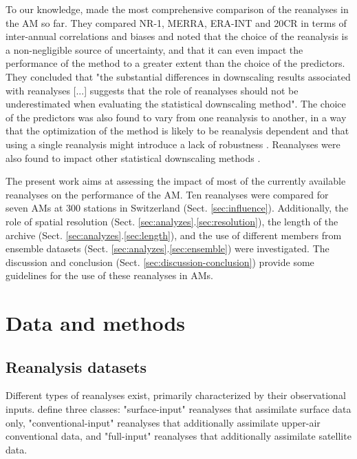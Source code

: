 \documentclass{ametsoc}
\begin{document}
	To our knowledge, \citet{Dayon2015} made the most comprehensive comparison of the reanalyses in the AM so far. They compared NR-1, MERRA, ERA-INT and 20CR in terms of inter-annual correlations and biases and noted that the choice of the reanalysis is a non-negligible source of uncertainty, and that it can even impact the performance of the method to a greater extent than the choice of the predictors. They concluded that "the substantial differences in downscaling results associated with reanalyses [...] suggests that the role of reanalyses should not be underestimated when evaluating the statistical downscaling method". The choice of the predictors was also found to vary from one reanalysis to another, in a way that the optimization of the method is likely to be reanalysis dependent and that using a single reanalysis might introduce a lack of robustness \citep{Dayon2015}. Reanalyses were also found to impact other statistical downscaling methods \citep[e.g.][]{Koukidis2009}.
	
	The present work aims at assessing the impact of most of the currently available reanalyses on the performance of the AM. Ten reanalyses were compared for seven AMs at 300 stations in Switzerland (Sect. \ref{sec:influence}). Additionally, the role of spatial resolution (Sect. \ref{sec:analyzes}.\ref{sec:resolution}), the length of the archive (Sect. \ref{sec:analyzes}.\ref{sec:length}), and the use of different members from ensemble datasets (Sect. \ref{sec:analyzes}.\ref{sec:ensemble}) were investigated. The discussion and conclusion (Sect. \ref{sec:discussion-conclusion}) provide some guidelines for the use of these reanalyses in AMs.
	
	
	\section{Data and methods}
	\label{sec:data}
	
	\subsection{Reanalysis datasets}
	
	Different types of reanalyses exist, primarily characterized by their observational inputs. \citet{Fujiwara2017} define three classes: "surface-input" reanalyses that assimilate surface data only, "conventional-input" reanalyses that additionally assimilate upper-air conventional data, and "full-input" reanalyses that additionally assimilate satellite data.
	
\end{document}
